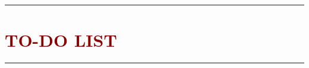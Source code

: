 \documentclass{article}
\begin{document}
\todo{$\succ$ --------------------}




\newpage

\begin{center} \textcolor{red}{\rule{\textwidth}{0.5pt}} \end{center}


\section*{\textcolor{DarkRed}{TO-DO LIST}}
\vspace{-6mm}
\listoftodos[]
\vspace{-1mm}
\begin{center} \textcolor{red}{\rule{\textwidth}{0.5pt}} \end{center}











% 
%   
% 

\printbibliography



















\end{document}
